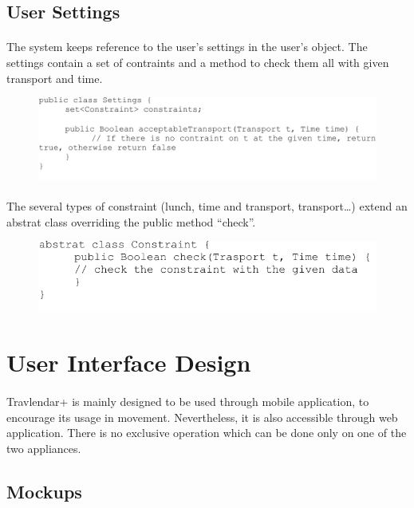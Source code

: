 \documentclass{article}
\begin{document}
		\subsection{User Settings}
			\paragraph{}The system keeps reference to the user’s settings in the user’s object. The settings contain a set of contraints and a method to check them all with given transport and time.\\
			\begin{figure}[H]
			\includegraphics[width=0.8\linewidth]{Algorithm_PDFs/Settings-cropped.pdf}
			\caption{}
			\label{fig:C6}
			\end{figure}
			\paragraph{}The several types of constraint (lunch, time and transport, transport…) extend an abstrat class overriding the public method “check”.
			\begin{figure}[H]
			\includegraphics[width=0.8\linewidth]{Algorithm_PDFs/Constraint-cropped.pdf}
			\caption{}
			\label{fig:C7}
			\end{figure}
		\newpage			
	\section{User Interface Design}
		\paragraph{}Travlendar+ is mainly designed to be used through mobile application, to encourage its usage in movement. Nevertheless, it is also accessible through web application. There is no exclusive operation which can be done only on one of the two appliances.
		\subsection{Mockups}
\end{document}
